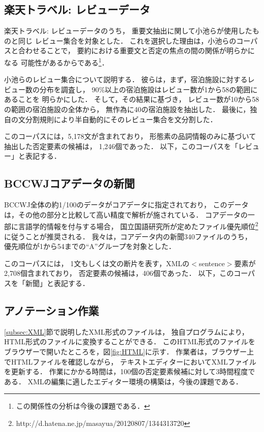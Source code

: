 \documentclass[japanese]{jnlp_1.4}
\begin{document}
\subsection{楽天トラベル: レビューデータ}

楽天トラベル: レビューデータのうち，
重要文抽出に関して小池らが使用したものと同じ
レビュー集合\cite{koike2012}を対象とした．
これを選択した理由は，小池らのコーパスと合わせることで，
要約における重要文と否定の焦点の間の関係が明らかになる
可能性があるからである\footnote{この関係性の分析は今後の課題である．}．

小池らのレビュー集合について説明する．
彼らは，まず，宿泊施設に対するレビュー数の分布を調査し，
90\%以上の宿泊施設はレビュー数が1から58の範囲にあることを
明らかにした．
そして，その結果に基づき，
レビュー数が10から58の範囲の宿泊施設の全体から，
無作為に40の宿泊施設を抽出した．
最後に，独自の文分割規則により半自動的にそのレビュー集合を文分割した．

このコーパスには，5,178文が含まれており，
形態素の品詞情報のみに基づいて抽出した否定要素の候補は，
1,246個であった．
以下，このコーパスを「レビュー」と表記する．


\subsection{BCCWJコアデータの新聞}

BCCWJ全体の約1/100のデータがコアデータに指定されており，
このデータは，その他の部分と比較して高い精度で解析が施されている．
コアデータの一部に言語学的情報を付与する場合，
国立国語研究所が定めたファイル優先順位\footnote{
http://d.hatena.ne.jp/masayua/20120807/1344313720}に従うことが推奨される．
我々は，コアデータ内の新聞340ファイルのうち，
優先順位が1から54までの``A''グループを対象とした．

このコーパスには，
1文もしくは文の断片を表す，XMLの$<$sentence$>$要素が2,708個含まれており，
否定要素の候補は，406個であった．
以下，このコーパスを「新聞」と表記する．


\subsection{アノテーション作業}

\ref{subsec:XML}節で説明したXML形式のファイルは，
独自プログラムにより，HTML形式のファイルに変換することができる．
このHTML形式のファイルをブラウザーで開いたところを，図\ref{fig:HTML}に示す．
作業者は，ブラウザー上でHTMLファイルを確認しながら，
テキストエディターにおいてXMLファイルを更新する．
作業にかかる時間は，100個の否定要素候補に対して3時間程度である．
XMLの編集に適したエディター環境の構築は，今後の課題である．
\end{document}
